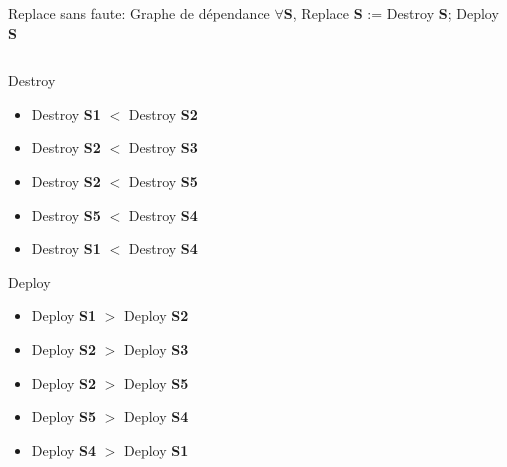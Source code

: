 \documentclass[aspectratio=169,10pt]{beamer}
\begin{document}
\begin{frame}{Replace sans faute: Graphe de dépendance}
$\forall${\bf S}, Replace {\bf S} := Destroy {\bf S}; Deploy {\bf S}
\vspace{-0.1in}
\begin{columns}[T,onlytextwidth]
    \begin{column}{.4\linewidth}
      \begin{alertblock}{Destroy}
  \begin{itemize}
    \item \small Destroy {\bf S1} $<$ Destroy {\bf S2}
    \item \alert<2>{\small Destroy {\bf S2} $<$ Destroy {\bf S3}}
    \item \alert<2>{\small Destroy {\bf S2} $<$ Destroy {\bf S5}}
    \item \alert<3>{\small Destroy {\bf S5} $<$ Destroy {\bf S4}}
    \item \small Destroy {\bf S1} $<$ Destroy {\bf S4}
  \end{itemize}
\end{alertblock}
\vspace{-0.05in}
\begin{alertblock}{Deploy}
  \begin{itemize}
    \item \small Deploy {\bf S1} $>$ Deploy {\bf S2}
    \item \alert<4>{\small Deploy {\bf S2} $>$ Deploy {\bf S3}}
    \item \alert<4>{\small Deploy {\bf S2} $>$ Deploy {\bf S5}}
    \item \alert<5>{\small Deploy {\bf S5} $>$ Deploy {\bf S4}}
    \item \small Deploy {\bf S4} $>$ Deploy {\bf S1}
  \end{itemize}
\end{alertblock}

    \end{column}
    
    \begin{column}{.5\linewidth}
     \vspace{-0.3cm}
      
    \end{column}
  \end{columns}

\end{frame}

\end{document}
